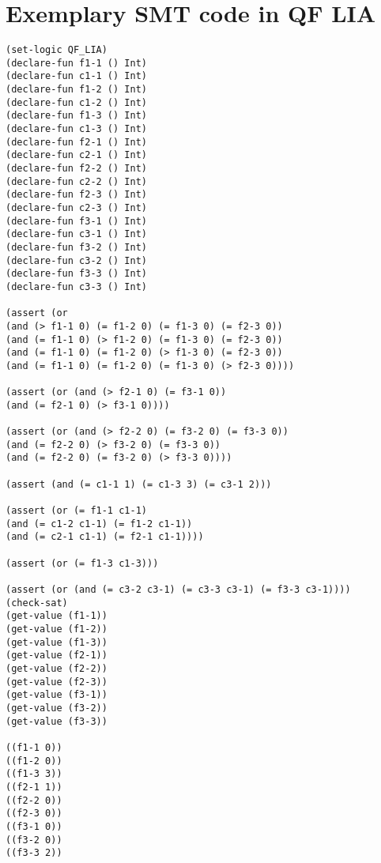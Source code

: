 \chapter{Exemplary SMT code in QF LIA}
\begin{lstlisting}
(set-logic QF_LIA)
(declare-fun f1-1 () Int)
(declare-fun c1-1 () Int)
(declare-fun f1-2 () Int)
(declare-fun c1-2 () Int)
(declare-fun f1-3 () Int)
(declare-fun c1-3 () Int)
(declare-fun f2-1 () Int)
(declare-fun c2-1 () Int)
(declare-fun f2-2 () Int)
(declare-fun c2-2 () Int)
(declare-fun f2-3 () Int)
(declare-fun c2-3 () Int)
(declare-fun f3-1 () Int)
(declare-fun c3-1 () Int)
(declare-fun f3-2 () Int)
(declare-fun c3-2 () Int)
(declare-fun f3-3 () Int)
(declare-fun c3-3 () Int)

(assert (or 
(and (> f1-1 0) (= f1-2 0) (= f1-3 0) (= f2-3 0)) 
(and (= f1-1 0) (> f1-2 0) (= f1-3 0) (= f2-3 0)) 
(and (= f1-1 0) (= f1-2 0) (> f1-3 0) (= f2-3 0)) 
(and (= f1-1 0) (= f1-2 0) (= f1-3 0) (> f2-3 0))))

(assert (or (and (> f2-1 0) (= f3-1 0)) 
(and (= f2-1 0) (> f3-1 0))))

(assert (or (and (> f2-2 0) (= f3-2 0) (= f3-3 0)) 
(and (= f2-2 0) (> f3-2 0) (= f3-3 0)) 
(and (= f2-2 0) (= f3-2 0) (> f3-3 0))))

(assert (and (= c1-1 1) (= c1-3 3) (= c3-1 2)))

(assert (or (= f1-1 c1-1) 
(and (= c1-2 c1-1) (= f1-2 c1-1)) 
(and (= c2-1 c1-1) (= f2-1 c1-1))))

(assert (or (= f1-3 c1-3)))

(assert (or (and (= c3-2 c3-1) (= c3-3 c3-1) (= f3-3 c3-1))))
(check-sat)
(get-value (f1-1))
(get-value (f1-2))
(get-value (f1-3))
(get-value (f2-1))
(get-value (f2-2))
(get-value (f2-3))
(get-value (f3-1))
(get-value (f3-2))
(get-value (f3-3))

((f1-1 0))
((f1-2 0))
((f1-3 3))
((f2-1 1))
((f2-2 0))
((f2-3 0))
((f3-1 0))
((f3-2 0))
((f3-3 2))
\end{lstlisting}

